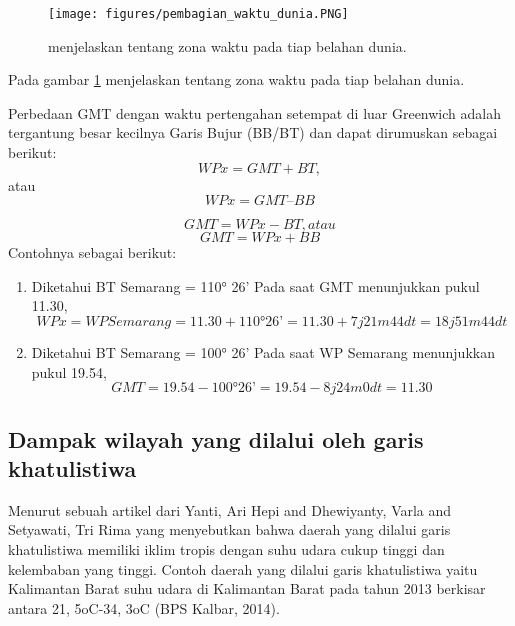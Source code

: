 \begin{figure}[ht]
\centerline{\texttt{[image: figures/pembagian\_waktu\_dunia.PNG]}}
\caption{menjelaskan tentang zona waktu pada tiap belahan dunia.}
\label{pembagian_waktu_dunia}
\end{figure}

Pada gambar \ref{pembagian_waktu_dunia} menjelaskan tentang zona waktu pada tiap belahan dunia.

	Perbedaan GMT dengan waktu pertengahan setempat di luar Greenwich adalah tergantung besar kecilnya Garis Bujur (BB/BT) dan dapat dirumuskan 
sebagai berikut:
\begin{equation}
WP x = GMT + BT, 
\end {equation}
atau 
\begin{equation}
WP x = GMT – BB
\end {equation}

\begin{equation}
GMT = WP x - BT, 
atau
\end{equation}
\begin{equation}
GMT = WP x + BB
\end{equation}
Contohnya sebagai berikut:

\begin {enumerate}
\item
Diketahui BT Semarang = 110° 26’
Pada saat GMT menunjukkan pukul 11.30, 
\begin{equation}
WP x = WP Semarang = 11.30 + 110° 26’
= 11.30 + 7 j 21m 44dt
= 18 j 51 m 44 dt
\end{equation}

\item
Diketahui BT Semarang = 100° 26’
Pada saat WP Semarang menunjukkan pukul 19.54,
\begin{equation}
GMT = 19.54 - 100° 26’
    = 19.54 - 8 j 24m 0dt
    = 11.30
\end{equation}
\end {enumerate}

\cite {khusurur2016mengenal}

\subsection {Dampak wilayah yang dilalui oleh garis khatulistiwa}

	Menurut sebuah artikel dari Yanti, Ari Hepi and Dhewiyanty, Varla and Setyawati, Tri Rima yang menyebutkan bahwa daerah yang dilalui garis khatulistiwa 
memiliki iklim tropis dengan suhu udara cukup tinggi dan kelembaban yang tinggi. Contoh daerah yang dilalui garis khatulistiwa yaitu Kalimantan Barat
suhu udara di Kalimantan Barat pada tahun 2013 berkisar antara 21, 5oC-34, 3oC (BPS Kalbar, 2014). \cite {yanti2015prevalensi}

